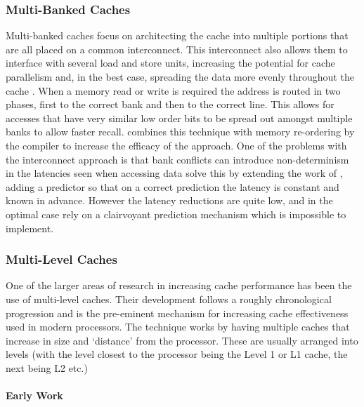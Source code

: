 \subsubsection{Multi-Banked Caches}

Multi-banked caches focus on architecting the cache into multiple portions that are all placed on a common interconnect. This interconnect also allows them to interface with several load and store units, increasing the potential for cache parallelism and, in the best case, spreading the data more evenly throughout the cache \cite{riversHighbandwidthDataCache1997}. When a memory read or write is required the address is routed in two phases, first to the correct bank and then to the correct line. This allows for accesses that have very similar low order bits to be spread out amongst multiple banks to allow faster recall. \citet{riversHighbandwidthDataCache1997} combines this technique with memory re-ordering by the compiler to increase the efficacy of the approach. One of the problems with the interconnect approach is that bank conflicts can introduce non-determinism in the latencies seen when accessing data \citet{neefsTechniqueHighBandwidth2000} solve this by extending the work of  \citeauthor{riversHighbandwidthDataCache1997}, adding a predictor so that on a correct prediction the latency is constant and known in advance. However the latency reductions are quite low, and in the optimal case rely on a clairvoyant prediction mechanism which is impossible to implement.

\subsubsection{Multi-Level Caches}
\label{sec:multi-level}
One of the larger areas of research in increasing cache performance has been the use of multi-level caches. Their development follows a roughly chronological progression and is the pre-eminent mechanism for increasing cache effectiveness used in modern processors. The technique works by having multiple caches that increase in size and `distance' from the processor. These are usually arranged into levels (with the level closest to the processor being the Level 1 or L1 cache, the next being L2 etc.) 


\paragraph{Early Work}

